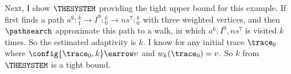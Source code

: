\begin{example}
{
Next, I show {$\THESYSTEM$} providing the tight upper bound for this example.
If first finds a path  
$a^{6}: {}^k_1 \to I^9:{}^k_0 \to ns^7:{}^k_0$ with three weighted vertices, and then $\pathsearch$ approximate this path to a walk, in which $a^6,I^9, ns^{7}$ is visited $k$ times. So the estimated adaptivity is $k$. I know for any initial trace $\trace_0$ where $\config{\trace_0, k} \earrow v$ and 
$w_k(\trace_0) = v$. So $k$ from {$\THESYSTEM$} is a tight bound.
}
\end{example}
